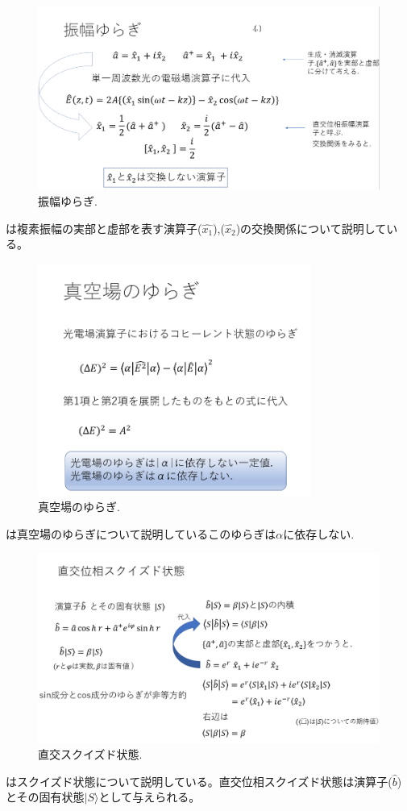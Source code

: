 \begin{figure}[htbp]
        \centering   
        \includegraphics[width=1.0\textwidth]{img/zemi12.png}
        \caption[sample image (png)]{振幅ゆらぎ.}
        \label{Fig:1_5_4}
    \end{figure}

    は複素振幅の実部と虚部を表す演算子($\hat{x_1}$),($\hat{x_2}$)の交換関係について説明している。

\begin{figure}[htbp]
        \centering   
        \includegraphics[width=0.8\textwidth]{img/zemi13.png}
        \caption[sample image (png)]{真空場のゆらぎ.}
        \label{Fig:1_5_5}
    \end{figure}
    は真空場のゆらぎについて説明しているこのゆらぎは$α$に依存しない.
    
\begin{figure}[htbp]
        \centering   
        \includegraphics[width=1.0\textwidth]{img/zemi14.png}
        \caption[sample image (png)]{直交スクイズド状態.}
        \label{Fig:1_5_6}
    \end{figure}
    はスクイズド状態について説明している。直交位相スクイズド状態は演算子($\hat{b}$)とその固有状態$|{S}\rangle$として与えられる。

